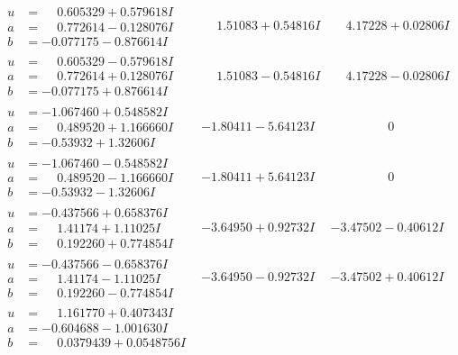 \documentclass[1p]{elsarticle_modified}
\theoremstyle{definition}
\begin{document}
$$\begin{array}{c|c|c}
\begin{aligned}
u &= \phantom{-}0.605329 + 0.579618 I \\
a &= \phantom{-}0.772614 - 0.128076 I \\
b &= -0.077175 - 0.876614 I\end{aligned}
 & \phantom{-}1.51083 + 0.54816 I & \phantom{-}4.17228 + 0.02806 I \\ \hline\begin{aligned}
u &= \phantom{-}0.605329 - 0.579618 I \\
a &= \phantom{-}0.772614 + 0.128076 I \\
b &= -0.077175 + 0.876614 I\end{aligned}
 & \phantom{-}1.51083 - 0.54816 I & \phantom{-}4.17228 - 0.02806 I \\ \hline\begin{aligned}
u &= -1.067460 + 0.548582 I \\
a &= \phantom{-}0.489520 + 1.166660 I \\
b &= -0.53932 + 1.32606 I\end{aligned}
 & -1.80411 - 5.64123 I & \phantom{-0.000000 } 0 \\ \hline\begin{aligned}
u &= -1.067460 - 0.548582 I \\
a &= \phantom{-}0.489520 - 1.166660 I \\
b &= -0.53932 - 1.32606 I\end{aligned}
 & -1.80411 + 5.64123 I & \phantom{-0.000000 } 0 \\ \hline\begin{aligned}
u &= -0.437566 + 0.658376 I \\
a &= \phantom{-}1.41174 + 1.11025 I \\
b &= \phantom{-}0.192260 + 0.774854 I\end{aligned}
 & -3.64950 + 0.92732 I & -3.47502 - 0.40612 I \\ \hline\begin{aligned}
u &= -0.437566 - 0.658376 I \\
a &= \phantom{-}1.41174 - 1.11025 I \\
b &= \phantom{-}0.192260 - 0.774854 I\end{aligned}
 & -3.64950 - 0.92732 I & -3.47502 + 0.40612 I \\ \hline\begin{aligned}
u &= \phantom{-}1.161770 + 0.407343 I \\
a &= -0.604688 - 1.001630 I \\
b &= \phantom{-}0.0379439 + 0.0548756 I\end{aligned}

\end{array}$$
\end{document}
